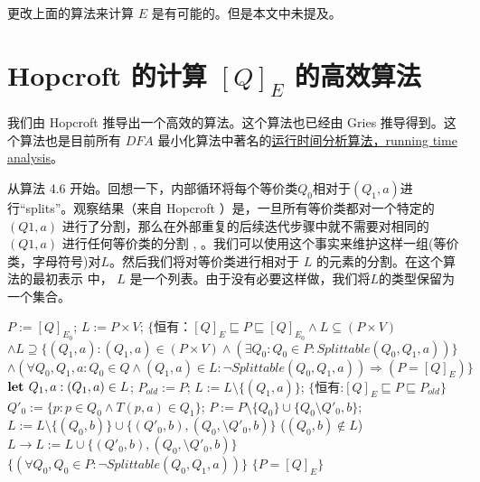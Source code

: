 更改上面的算法来计算 $E$ 是有可能的。但是本文中未提及。

\section{Hopcroft 的计算 $[Q]_E$ 的高效算法}

我们由 Hopcroft 推导出一个高效的算法。这个算法也已经由 Gries \cite{Grie73} 推导得到。这个算法也是目前所有 $DFA$ 最小化算法中著名的\uline{运行时间分析算法，running time analysis}。

从算法 4.6 开始。回想一下，内部循环将每个等价类$Q_0$相对于$(Q_1, a)$进行“splits”。观察结果（来自 Hopcroft ）是，一旦所有等价类都对一个特定的 $(Q1,a)$ 进行了分割，那么在外部重复的后续迭代步骤中就不需要对相同的$(Q1,a)$ 进行任何等价类的分割 \cite[pp.190-191]{Hopc71}, \cite[引理 5]{Grie73}。我们可以使用这个事实来维护这样一组(等价类，字母符号)对$L$。然后我们将对等价类进行相对于 $L$ 的元素的分割。在这个算法的最初表示 \cite{Hopc71, Grie73} 中， $L$ 是一个列表。由于没有必要这样做，我们将$L$的类型保留为一个集合。

\begin{algorithm}
    \small
    \begin{algorithmic}[1]
        \State $P:=[Q]_{E_0}$;
        \State $L:=P\times V$;
        \State $\{ \mbox{恒有：} [Q]_E \sqsubseteq P \sqsubseteq [Q]_{E_0} \land L \subseteq (P \times V) $
        \State \quad $ \land L \supseteq  \{ (Q_1,a) : (Q_1,a) \in (P \times V) \land ( \exists Q_0 : Q_0 \in P : Splittable (Q_0,Q_1,a) ) \} $
        \State \quad $ \land (\forall Q_0,Q_1,a:Q_0 \in Q \land (Q_1,a) \in L : \neg Splittable (Q_0,Q_1,a)) \Rightarrow (P=[Q]_E) \} $
            \State $ \mbox{\textbf{let }} Q_1,a:(Q_1,a) \in L $;
            \State $ P_{old} := P $;
            \State $ L := L \setminus \{ (Q_1,a) \} $;
            \State $ \{ \mbox{恒有:} [Q]_E \sqsubseteq P \sqsubseteq P_{old} \} $
                \State $ Q'_0 := \{ p:p \in Q_0 \land T(p,a) \in Q_1 \} $;
                \State $ P:= P \setminus \{ Q_0 \} \cup \{ Q_0 \setminus Q'_0,b \} $;
                       $ L := L \setminus \{ (Q_0,b) \} \cup \{ (Q'_0,b),(Q_0, \setminus Q'_0,b ) \} $
                    \ElsIf($(Q_0,b) \not\in L$)
                        $L \rightarrow L := L \cup \{ (Q'_0,b),(Q_0, \setminus Q'_0,b ) \}$
                    \EndIf
                \EndFor
            \EndFor
            \State $ \{ (\forall Q_0,Q_0 \in P : \neg Splittable(Q_0,Q_1,a)) \} $
        \Until $\{ P = [Q]_E \}$
    \end{algorithmic}
\end{algorithm}

